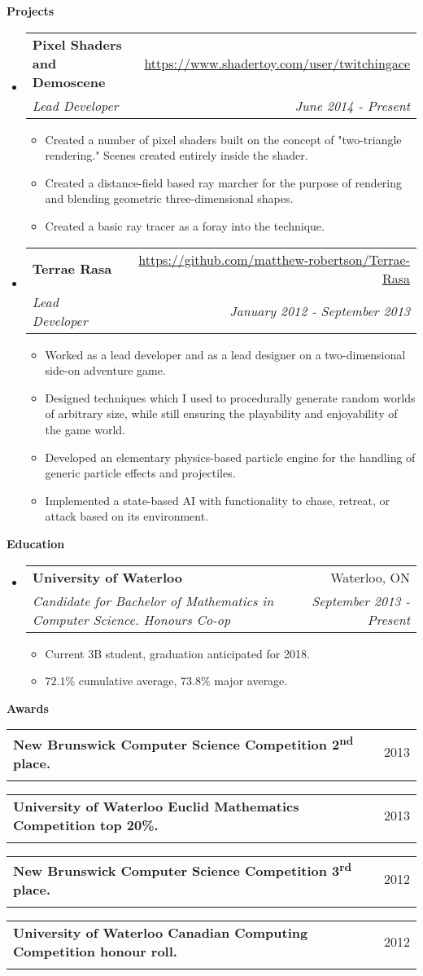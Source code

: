 \documentclass[letterpaper,11pt]{article}
\makeatletter
\newcommand{\resitem}[1]{\item #1 \vspace{-2pt}}
\newcommand{\resheading}[1]{{\large \colorbox{mygrey}{\begin{minipage}{\textwidth}{\textbf{#1 \vphantom{p\^{E}}}}\end{minipage}}}}
\newcommand{\ressubheading}[4]{
\begin{tabular*}{7.0in}{l@{\extracolsep{\fill}}r}
		\textbf{#1} & #2 \\
		\textit{#3} & \textit{#4} \\
\end{tabular*}\vspace{-6pt}}
\makeatother
\begin{document}
\resheading{Projects}
\begin{itemize}
\item
	\ressubheading{Pixel Shaders and Demoscene}{\url{https://www.shadertoy.com/user/twitchingace}}{Lead Developer}{June 2014 - Present}
	\begin{itemize}
		\resitem{Created a number of pixel shaders built on the concept of "two-triangle rendering." Scenes created entirely inside the shader.}
		\resitem{Created a distance-field based ray marcher for the purpose of rendering and blending geometric three-dimensional shapes.}
		\resitem{Created a basic ray tracer as a foray into the technique.}
	\end{itemize}
\newpage
\item
	\ressubheading{Terrae Rasa}{\url{https://github.com/matthew-robertson/Terrae-Rasa}}{Lead Developer}{January 2012 - September 2013}
	\begin{itemize}
		\resitem{Worked as a lead developer and as a lead designer on a two-dimensional side-on adventure game.}
		\resitem{Designed techniques which I used to procedurally generate random worlds of arbitrary size, while still ensuring the playability and enjoyability of the game world.}
		\resitem{Developed an elementary physics-based particle engine for the handling of generic particle effects and projectiles.}
		\resitem{Implemented a state-based AI with functionality to chase, retreat, or attack based on its environment.}
	\end{itemize}
\end{itemize}

\resheading{Education}
\begin{itemize}
\item
	\ressubheading{University of Waterloo}{Waterloo, ON}{Candidate for Bachelor of Mathematics in Computer Science. Honours Co-op}{September 2013 - Present}
	\begin{itemize}
		\resitem{Current 3B student, graduation anticipated for 2018.}
		\resitem{$72.1\%$ cumulative average, $73.8\%$ major average.}	
	\end{itemize}

\end{itemize}

\resheading{Awards}
\begin{description}
\item
	\ressubheading{New Brunswick Computer Science Competition 2\textsuperscript{nd} place.}{2013}{}{}
\item
	\ressubheading{University of Waterloo Euclid Mathematics Competition top 20\%.} {2013} {} {}

\item
\ressubheading{New Brunswick Computer Science Competition 3\textsuperscript{rd} place.}{2012}{}{}
\item
\ressubheading{University of Waterloo Canadian Computing Competition honour roll.}{2012}{}{}
\end{description}
\end{document}
